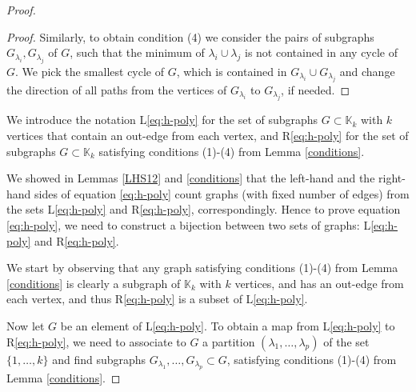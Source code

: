\begin{proof}
\begin{proof}
Similarly, to obtain condition (4) we consider the pairs of subgraphs $G_{\lambda_i}, G_{\lambda_j}$ of $G$, such that the minimum of $\lambda_i\cup \lambda_j$ is not contained in any cycle of $G$. We pick the smallest cycle of $G$, which is contained in  $G_{\lambda_i}\cup G_{\lambda_j}$ and change the 
 direction of all paths from the vertices of $G_{\lambda_i}$ to $G_{\lambda_j}$, if needed. 
\end{proof}

\begin{nota}
We introduce the notation L\eqref{eq:h-poly} for the set of subgraphs $G\subset\mathbb{K}_k$ with $k$ vertices that contain an out-edge from each vertex, and R\eqref{eq:h-poly} for the set of subgraphs $G\subset\mathbb{K}_k$ satisfying conditions (1)-(4) from Lemma \ref{conditions}.
\end{nota}

We showed in Lemmas \ref{LHS12} and \ref{conditions} that the left-hand and the right-hand sides of equation \eqref{eq:h-poly} count graphs (with fixed number of edges) from the sets L\eqref{eq:h-poly} and R\eqref{eq:h-poly}, correspondingly.
 Hence to prove equation \eqref{eq:h-poly}, we need to construct a bijection 
 between two sets of graphs: L\eqref{eq:h-poly} and R\eqref{eq:h-poly}. 


We start by observing that any graph satisfying conditions (1)-(4) from Lemma \ref{conditions} is clearly a subgraph of $\mathbb{K}_k$ with $k$ vertices, and has an out-edge from each vertex, and thus R\eqref{eq:h-poly} is a subset of L\eqref{eq:h-poly}.

Now let $G$ be an element of L\eqref{eq:h-poly}. To obtain a map from L\eqref{eq:h-poly} to R\eqref{eq:h-poly}, we 
need to associate to $G$ a partition $(\lambda_1, \ldots ,\lambda_p)$  of the set $\{1, \ldots ,k\}$ and find subgraphs $G_{\lambda_1}, \ldots ,G_{\lambda_p} \subset G$, satisfying conditions (1)-(4) from Lemma \ref{conditions}.


\end{proof}
